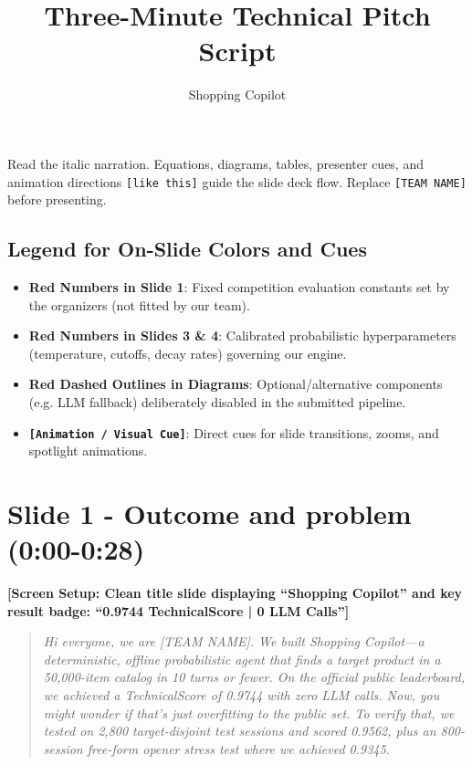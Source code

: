 \documentclass[11pt]{article}
\title{Three-Minute Technical Pitch Script}
\author{Shopping Copilot}
\date{}
\newcommand{\const}[1]{\textcolor{constantred}{#1}}
\newenvironment{narration}{\begin{quote}\itshape}{\end{quote}}
\begin{document}
\maketitle

Read the italic narration. Equations, diagrams, tables, presenter cues, and animation directions \texttt{[like this]} guide the slide deck flow. Replace \texttt{[TEAM NAME]} before presenting.

\subsection*{Legend for On-Slide Colors and Cues}
\begin{itemize}
  \item \textbf{\const{Red Numbers} in Slide 1}: Fixed competition evaluation constants set by the organizers (not fitted by our team).
  \item \textbf{\const{Red Numbers} in Slides 3 \& 4}: Calibrated probabilistic hyperparameters (temperature, cutoffs, decay rates) governing our engine.
  \item \textbf{Red Dashed Outlines in Diagrams}: Optional/alternative components (e.g. LLM fallback) deliberately disabled in the submitted pipeline.
  \item \textbf{\texttt{[Animation / Visual Cue]}}: Direct cues for slide transitions, zooms, and spotlight animations.
\end{itemize}

\section*{Slide 1 - Outcome and problem (0:00-0:28)}

\textbf{[Screen Setup: Clean title slide displaying ``Shopping Copilot'' and key result badge: ``0.9744 TechnicalScore | 0 LLM Calls'']}

\begin{narration}
Hi everyone, we are [TEAM NAME]. We built Shopping Copilot---a deterministic, offline probabilistic
agent that finds a target product in a 50,000-item catalog in 10 turns or fewer. On the official public
leaderboard, we achieved a TechnicalScore of 0.9744 with zero LLM calls. Now, you might wonder if that's
just overfitting to the public set. To verify that, we tested on 2,800 target-disjoint test sessions
and scored 0.9562, plus an 800-session free-form opener stress test where we achieved 0.9345.
\end{narration}
\end{document}
